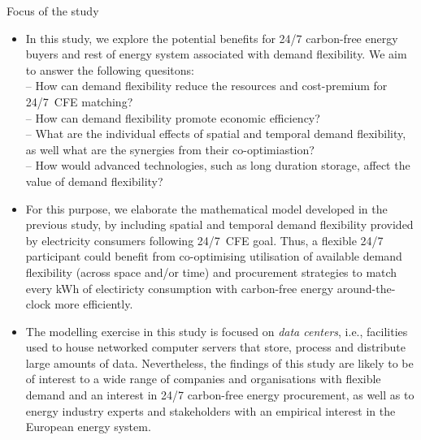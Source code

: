 \begin{frame}{Focus of the study}

  {\footnotesize
  \begin{itemize}
    \item In this study, we explore the potential benefits for 24/7 carbon-free energy buyers and rest of energy system associated with demand flexibility. We aim to answer the following quesitons: \\

    \vspace{0.1cm}
    -- How can demand flexibility reduce the \alert{resources} and \alert{cost-premium} for 24/7~CFE matching?\\ 
    -- How can demand flexibility promote \alert{economic efficiency}?\\
    -- What are the \alert{individual effects} of spatial and temporal demand flexibility, as well what are the synergies from their co-optimiastion? \\
    -- How would advanced technologies, such as long duration storage, affect \alert{the value of demand flexibility}?

    \item For this purpose, we elaborate the mathematical model developed in the previous study, by including spatial and temporal demand flexibility provided by electricity consumers following 24/7~CFE goal. Thus, a flexible 24/7 participant could benefit from \alert{co-optimising} utilisation of available demand flexibility (across space and/or time) and procurement strategies to match every kWh of electiricty consumption with carbon-free energy around-the-clock \alert{more efficiently}.
    
    \item The modelling exercise in this study is focused on \textit{data centers}, i.e., facilities used to house networked computer servers that store, process and distribute large amounts of data. Nevertheless, the findings of this study are likely to be of interest to a wide range of companies and organisations with flexible demand and an interest in 24/7 carbon-free energy procurement, as well as to energy industry experts and stakeholders with an empirical interest in the European energy system.

  \end{itemize}

  }
\end{frame}


